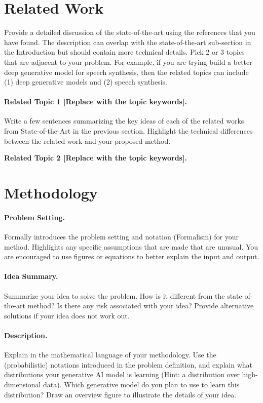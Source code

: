 \documentclass{article}
\begin{document}
\section{Related Work}
Provide a detailed discussion of the state-of-the-art using the
references that you have found. The description can overlap with the
state-of-the-art sub-section in the Introduction but should contain
more technical details. Pick 2 or 3 topics that are adjacent to your
problem. For example, if you are trying build a better deep
generative model for speech synthesis, then the related topics can
include (1) deep generative models and (2) speech synthesis.

\paragraph{Related Topic 1 [Replace with the topic keywords].} Write
a few sentences summarizing the key ideas of each of the related
works from State-of-the-Art in the previous section. Highlight the
technical differences between the related work and your proposed method.

\textbf{Related Topic 2 [Replace with the topic keywords].}

\section{Methodology}

\paragraph{Problem Setting.}
Formally introduces the problem setting and notation (Formalism) for
your method. Highlights any specific assumptions that are made that
are unusual. You are encouraged to use figures or equations to
better explain the input and output.

\paragraph{Idea Summary.}
Summarize your idea to solve the problem.  How is it different from
the state-of-the-art method?  Is there any risk associated with your
idea? Provide alternative solutions if your idea does not work out.

\paragraph{Description.}
Explain in the mathematical language of your methodology. Use the
(probabilistic) notations introduced in the problem definition, and
explain what distributions your generative AI model is learning
(Hint: a distribution over high-dimensional data). Which generative
model do you plan to use to learn this distribution?    Draw an
overview figure to illustrate the details of your idea.
\end{document}
